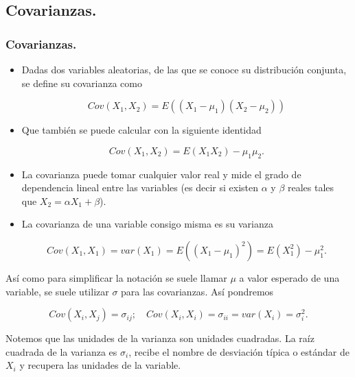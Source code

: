 \subsection{Covarianzas.}
\begin{frame}
\frametitle{Covarianzas.}
\begin{itemize}
\item Dadas dos variables aleatorias, de las que se conoce su distribución conjunta, se define su covarianza como 

$$Cov(X_1,X_2)=E((X_1-\mu_1) ( X_2-\mu_2))$$

\item  Que también se puede calcular con la siguiente identidad

$$Cov(X_1,X_2)=E(X_1 X_2) -\mu_1 \mu_2.$$

\item La covarianza puede tomar cualquier valor real y mide el grado de dependencia lineal entre las variables (es decir si existen $\alpha$ y $\beta$ reales tales que $X_2=\alpha X_1+\beta$). 
 
 \item  La covarianza de una variable consigo misma es su varianza

$$Cov(X_1,X_1)=var(X_1)=E((X_1-\mu_1)^2)=E(X_1^2)-\mu_1^2.$$
\end{itemize}
\end{frame}
\begin{frame}

Así como para simplificar la notación se suele llamar $\mu$ a valor esperado de una variable, se suele utilizar $\sigma$ para las covarianzas. Así pondremos

$$Cov(X_i,X_j)=\sigma_{i j};\quad Cov(X_i,X_i)=\sigma_{ii}=var(X_i)=\sigma_i^2.$$

Notemos que las unidades de la varianza son unidades cuadradas. La raíz cuadrada de la varianza  es $\sigma_i$, recibe el nombre de desviación típica o estándar de $X_i$ y recupera las unidades de la variable.
\end{frame}
